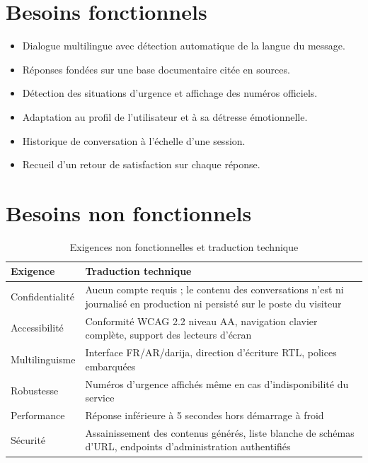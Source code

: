 \documentclass[a4paper,11pt,twoside]{report}
\begin{document}
\section{Besoins fonctionnels}

\begin{itemize}[itemsep=1pt]
  \item Dialogue multilingue avec détection automatique de la langue du message.
  \item Réponses fondées sur une base documentaire citée en sources.
  \item Détection des situations d'urgence et affichage des numéros officiels.
  \item Adaptation au profil de l'utilisateur et à sa détresse émotionnelle.
  \item Historique de conversation à l'échelle d'une session.
  \item Recueil d'un retour de satisfaction sur chaque réponse.
\end{itemize}

\section{Besoins non fonctionnels}

\begin{table}[htbp]
\centering
\small
\begin{tabular}{@{}lp{9.2cm}@{}}
\toprule
\textbf{Exigence} & \textbf{Traduction technique} \\
\midrule
Confidentialité & Aucun compte requis ; le contenu des conversations n'est ni journalisé en production ni persisté sur le poste du visiteur \\
Accessibilité & Conformité WCAG 2.2 niveau AA, navigation clavier complète, support des lecteurs d'écran \\
Multilinguisme & Interface FR/AR/darija, direction d'écriture RTL, polices embarquées \\
Robustesse & Numéros d'urgence affichés même en cas d'indisponibilité du service \\
Performance & Réponse inférieure à 5 secondes hors démarrage à froid \\
Sécurité & Assainissement des contenus générés, liste blanche de schémas d'URL, endpoints d'administration authentifiés \\
\bottomrule
\end{tabular}
\caption{Exigences non fonctionnelles et traduction technique}
\label{tab:nfr}
\end{table}
\end{document}
